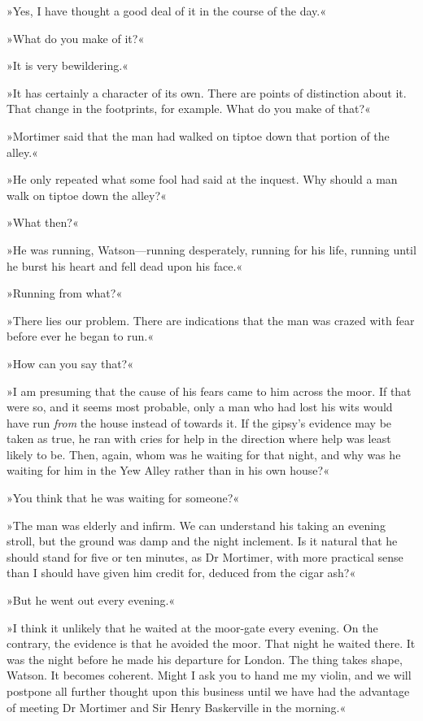 »Yes, I have thought a good deal of it in the course of the day.«

»What do you make of it?«

»It is very bewildering.«

»It has certainly a character of its own. There are points of distinction about it. That change in the footprints, for example. What do you make of that?«

»Mortimer said that the man had walked on tiptoe down that portion of the alley.«

»He only repeated what some fool had said at the inquest. Why should a man walk on tiptoe down the alley?«

»What then?«

»He was running, Watson—running desperately, running for his life, running until he burst his heart and fell dead upon his face.«

»Running from what?«

»There lies our problem. There are indications that the man was crazed with fear before ever he began to run.«

»How can you say that?«

»I am presuming that the cause of his fears came to him across the moor. If that were so, and it seems most probable, only a man who had lost his wits would have run \emph{from} the house instead of towards it. If the gipsy's evidence may be taken as true, he ran with cries for help in the direction where help was least likely to be. Then, again, whom was he waiting for that night, and why was he waiting for him in the Yew Alley rather than in his own house?«

»You think that he was waiting for someone?«

»The man was elderly and infirm. We can understand his taking an evening stroll, but the ground was damp and the night inclement. Is it natural that he should stand for five or ten minutes, as Dr Mortimer, with more practical sense than I should have given him credit for, deduced from the cigar ash?«

»But he went out every evening.«

»I think it unlikely that he waited at the moor-gate every evening. On the contrary, the evidence is that he avoided the moor. That night he waited there. It was the night before he made his departure for London. The thing takes shape, Watson. It becomes coherent. Might I ask you to hand me my violin, and we will postpone all further thought upon this business until we have had the advantage of meeting Dr Mortimer and Sir Henry Baskerville in the morning.«

